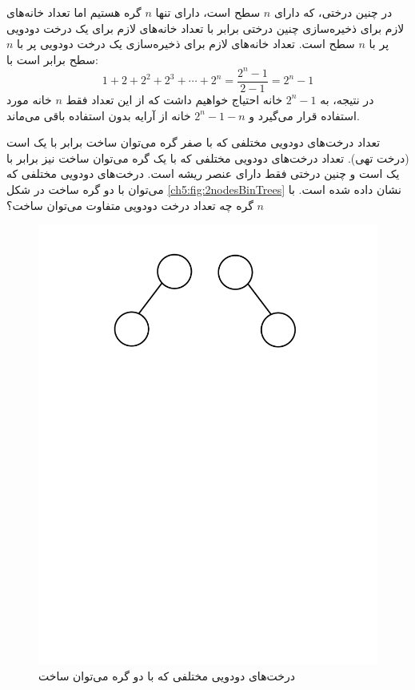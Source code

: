 در چنین درختی، که دارای {$n$} سطح است، دارای تنها {$n$} گره هستیم اما تعداد خانه‌های لازم برای ذخیره‌سازی چنین درختی برابر با تعداد خانه‌های لازم برای یک درخت دودویی پر با {$n$} سطح است. تعداد خانه‌های لازم برای ذخیره‌سازی یک درخت دودویی پر با {$n$} سطح برابر است با:
\begin{displaymath}
1+2+2^2+2^3+\cdots +2^n=\frac{2^n-1}{2-1}=2^n-1
\end{displaymath}
در نتیجه، به  {$2^n-1$} خانه احتیاج خواهیم داشت که از این تعداد فقط {$n$} خانه مورد استفاده قرار می‌گیرد و {$2^n-1-n$} خانه از آرایه بدون استفاده باقی می‌ماند.

 تعداد درخت‌های دودویی مختلفی که با صفر گره می‌توان ساخت برابر با یک است (درخت تهی). تعداد درخت‌های دودویی مختلفی که با یک گره می‌توان ساخت نیز برابر با یک است و چنین درختی فقط دارای عنصر ریشه است. درخت‌های دودویی مختلفی که می‌توان با دو گره ساخت در شکل {\eqref{ch5:fig:2nodesBinTrees}} نشان داده شده است. با {$n$} گره چه تعداد درخت دودویی متفاوت می‌توان ساخت؟

\begin{figure}
\begin{center}
\includegraphics[scale=0.33]{figs/ch5/binary_trees_with_two_nodes.pdf}
\caption{درخت‌های دودویی مختلفی که با دو گره می‌توان ساخت}\label{ch5:fig:2nodesBinTrees}
\end{center}
\end{figure}

